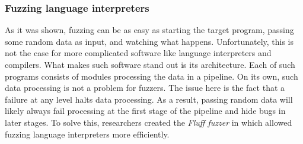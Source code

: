 \subsubsection{Fuzzing language interpreters}
As it was shown, fuzzing can be as easy as starting the target program, passing some random data as input, and watching what happens. Unfortunately, this is not the case for more complicated software like language interpreters and compilers. What makes such software stand out is its architecture. Each of such programs consists of modules processing the data in a pipeline. On its own, such data processing is not a problem for fuzzers. The issue here is the fact that a failure at any level halts data processing. As a result, passing random data will likely always fail processing at the first stage of the pipeline and hide bugs in later stages. To solve this, researchers created the \textit{Fluff fuzzer} in \cite{dominiak2019efficient} which allowed fuzzing language interpreters more efficiently.

